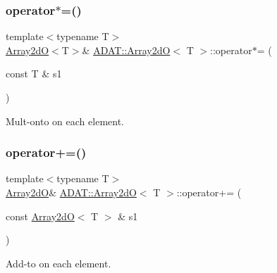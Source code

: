 \subsubsection{\texorpdfstring{operator$\ast$=()}{operator*=()}\hspace{0.1cm}{\footnotesize\ttfamily [4/4]}}
{\footnotesize\ttfamily template$<$typename T$>$ \\
\mbox{\hyperlink{classADAT_1_1Array2dO}{Array2dO}}$<$T$>$\& \mbox{\hyperlink{classADAT_1_1Array2dO}{A\+D\+A\+T\+::\+Array2dO}}$<$ T $>$\+::operator$\ast$= (\begin{DoxyParamCaption}\item[{const T \&}]{s1 }\end{DoxyParamCaption})\hspace{0.3cm}{\ttfamily [inline]}}



Mult-\/onto on each element. 

\mbox{\label{classADAT_1_1Array2dO_ad74aea8e13378655e8abe2a2bbddb7bc}} 
\subsubsection{\texorpdfstring{operator+=()}{operator+=()}\hspace{0.1cm}{\footnotesize\ttfamily [1/4]}}
{\footnotesize\ttfamily template$<$typename T$>$ \\
\mbox{\hyperlink{classADAT_1_1Array2dO}{Array2dO}}\& \mbox{\hyperlink{classADAT_1_1Array2dO}{A\+D\+A\+T\+::\+Array2dO}}$<$ T $>$\+::operator+= (\begin{DoxyParamCaption}\item[{const \mbox{\hyperlink{classADAT_1_1Array2dO}{Array2dO}}$<$ T $>$ \&}]{s1 }\end{DoxyParamCaption})\hspace{0.3cm}{\ttfamily [inline]}}



Add-\/to on each element. 

\mbox{\label{classADAT_1_1Array2dO_ad74aea8e13378655e8abe2a2bbddb7bc}} 
